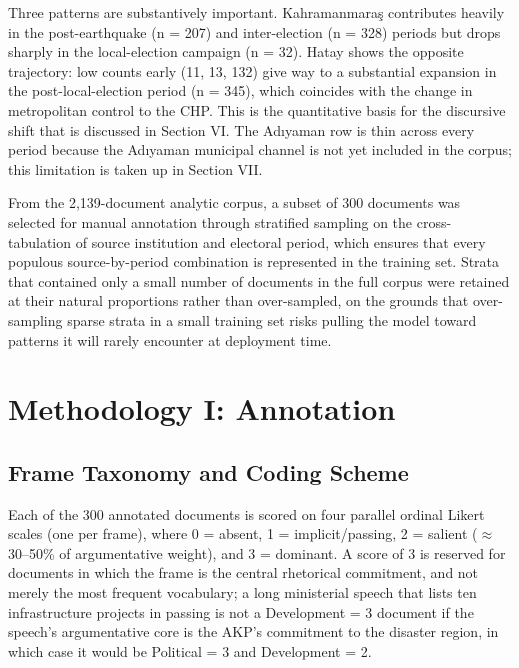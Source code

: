 \documentclass[12pt, journal]{IEEEtran}
\begin{document}
Three patterns are substantively important. Kahramanmara\c{s} contributes heavily in the post-earthquake (n = 207) and inter-election (n = 328) periods but drops sharply in the local-election campaign (n = 32). Hatay shows the opposite trajectory: low counts early (11, 13, 132) give way to a substantial expansion in the post-local-election period (n = 345), which coincides with the change in metropolitan control to the CHP. This is the quantitative basis for the discursive shift that is discussed in Section VI. The Ad\i yaman row is thin across every period because the Ad\i yaman municipal channel is not yet included in the corpus; this limitation is taken up in Section VII.

From the 2,139-document analytic corpus, a subset of 300 documents was selected for manual annotation through stratified sampling on the cross-tabulation of source institution and electoral period, which ensures that every populous source-by-period combination is represented in the training set. Strata that contained only a small number of documents in the full corpus were retained at their natural proportions rather than over-sampled, on the grounds that over-sampling sparse strata in a small training set risks pulling the model toward patterns it will rarely encounter at deployment time.

\section{Methodology I: Annotation}
\subsection{Frame Taxonomy and Coding Scheme}
Each of the 300 annotated documents is scored on four parallel ordinal Likert scales (one per frame), where 0 = absent, 1 = implicit/passing, 2 = salient ($\approx$30--50\% of argumentative weight), and 3 = dominant. A score of 3 is reserved for documents in which the frame is the central rhetorical commitment, and not merely the most frequent vocabulary; a long ministerial speech that lists ten infrastructure projects in passing is not a Development = 3 document if the speech's argumentative core is the AKP's commitment to the disaster region, in which case it would be Political = 3 and Development = 2.
\end{document}

